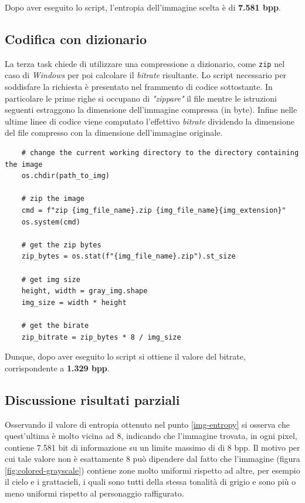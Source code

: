 \noindent Dopo aver eseguito lo script, l'entropia dell'immagine scelta è di \textbf{7.581 bpp}.



\vspace{15px}\subsection{Codifica con dizionario} \label{dictionary-coding}
La terza task chiede di utilizzare una compressione a dizionario, come \texttt{zip} nel caso di \textsl{Windows} per poi calcolare il \textsl{bitrate} risultante. Lo script necessario per soddisfare la richiesta è presentato nel frammento di codice sottostante. In particolare le prime righe si occupano di \textsl{"zippare"} il file mentre le istruzioni seguenti estraggono la dimensione dell'immagine compressa (in byte). Infine nelle ultime linee di codice viene computato l'effettivo \textsl{bitrate} dividendo la dimensione del file compresso con la dimensione dell'immagine originale.

\begin{lstlisting}
    # change the current working directory to the directory containing the image
    os.chdir(path_to_img)

    # zip the image
    cmd = f"zip {img_file_name}.zip {img_file_name}{img_extension}"
    os.system(cmd)
    
    # get the zip bytes
    zip_bytes = os.stat(f"{img_file_name}.zip").st_size

    # get img size
    height, width = gray_img.shape
    img_size = width * height

    # get the birate
    zip_bitrate = zip_bytes * 8 / img_size 
\end{lstlisting}

\noindent Dunque, dopo aver eseguito lo script si ottiene il valore del bitrate, corrispondente a \textbf{1.329 bpp}. 



\vspace{15px}\subsection{Discussione risultati parziali}
Osservando il valore di entropia ottenuto nel punto \ref{img-entropy} si osserva che quest'ultima è molto vicina ad 8, indicando che l'immagine trovata, in ogni pixel, contiene 7.581 bit di informazione su un limite massimo di di 8 bpp. Il motivo per cui tale valore non è esattamente 8 può dipendere dal fatto che l'immagine (figura \ref{fig:colored-grayscale}) contiene zone molto uniformi rispetto ad altre, per esempio il cielo e i grattacieli, i quali sono tutti della stessa tonalità di grigio e sono più o meno uniformi rispetto al personaggio raffigurato.

